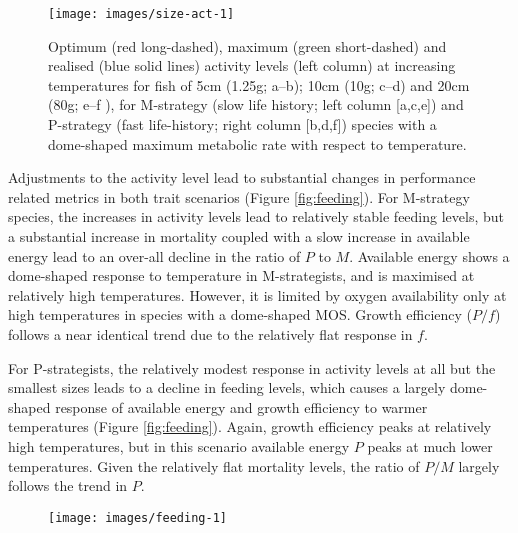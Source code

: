 \documentclass[a4paper, toc=index,abstract=true]{scrartcl}\usepackage[]{graphicx}\usepackage[]{color}
\makeatletter
\def\maxwidth{ %
  \ifdim\Gin@nat@width>\linewidth
    \linewidth
  \else
    \Gin@nat@width
  \fi
}
\makeatother
\begin{document}
\begin{spacing}{1.9}
\begin{figure}
{\centering \texttt{[image: images/size-act-1]} 

}

\caption[Optimum (red long-dashed), maximum (green short-dashed) and realised (blue solid lines) activity levels (left column) at increasing temperatures for fish of 5cm (1.25g]{Optimum (red long-dashed), maximum (green short-dashed) and realised (blue solid lines) activity levels (left column) at increasing temperatures for fish of 5cm (1.25g; a--b); 10cm (10g; c--d) and 20cm (80g; e--f ), for M-strategy (slow life history; left column [a,c,e]) and P-strategy (fast life-history; right column [b,d,f]) species with a dome-shaped maximum metabolic rate with respect to temperature.}\label{fig:size-act}
\end{figure}



Adjustments to the activity level lead to substantial changes in performance related metrics in both trait scenarios (Figure \ref{fig:feeding}). For M-strategy species, the increases in activity levels lead to relatively stable feeding levels, but a substantial increase in mortality coupled with a slow increase in available energy lead to an over-all decline in the ratio of $P$ to $M$. Available energy shows a dome-shaped response to temperature in M-strategists, and is maximised at relatively high temperatures. However, it is limited by oxygen availability only at high temperatures in species with a dome-shaped MOS. Growth efficiency ($P/f$) follows a near identical trend due to the relatively flat response in $f$.

For P-strategists, the relatively modest response in activity levels at all but the smallest sizes leads to a decline in feeding levels, which causes a largely dome-shaped response of available energy and growth efficiency to warmer temperatures (Figure \ref{fig:feeding}). Again, growth efficiency peaks at relatively high temperatures, but in this scenario available energy $P$ peaks at much lower temperatures. Given the relatively flat mortality levels, the ratio of $P/M$ largely follows the trend in $P$. 

\begin{figure}

{\centering \texttt{[image: images/feeding-1]} 

}


\end{figure}
\end{spacing}
\end{document}
